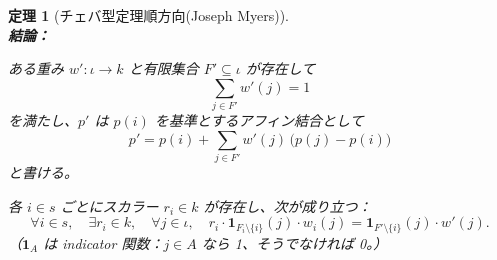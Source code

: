 \documentclass[a4paper,12pt]{bxjsbook}
\theoremstyle{theorem}
\newtheorem{theorem}{定理}[chapter]
\begin{document}
\begin{theorem}[チェバ型定理順方向(Joseph Myers)]
        \noindent\textbf{\\結論：}\par
        \begin{theoremenumerate}[label=(C\arabic*), leftmargin=4em, topsep=2pt, partopsep=0pt, itemsep=0pt, parsep=0pt]
            \item ある重み $w' : \iota \to k$ と有限集合 $F' \subseteq \iota$ が存在して
            \[
            \sum_{j \in F'} w'(j) = 1
            \]
            を満たし、$p'$ は $p(i)$ を基準とするアフィン結合として
            \[
            p' = p(i) + \sum_{j \in F'} w'(j)\,\bigl(p(j) - p(i)\bigr)
            \]
            と書ける。
            \item 各 $i \in s$ ごとにスカラー $r_i \in k$ が存在し、次が成り立つ：
            \[
            \forall i \in s, \quad \exists r_i \in k, \quad \forall j \in \iota, \quad r_i \cdot \mathbf{1}_{F_i \setminus \{i\}}(j) \cdot w_i(j) = \mathbf{1}_{F' \setminus \{i\}}(j) \cdot w'(j).
            \]
            （$\mathbf{1}_A$ は indicator 関数：$j \in A$ なら 1、そうでなければ 0。）
        \end{theoremenumerate}
    \end{theorem}
\end{document}
